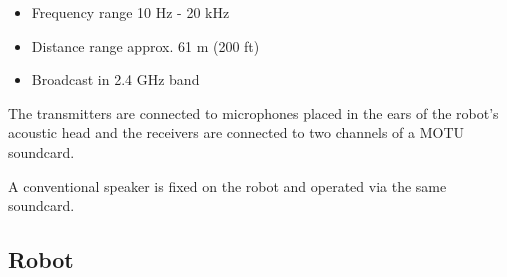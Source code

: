   \begin{itemize}
      \item Frequency range 10 Hz - 20 kHz
      \item Distance range approx. 61 m (200 ft)
      \item Broadcast in 2.4 GHz band
  \end{itemize}

  The transmitters are connected to microphones placed in the ears of the robot's acoustic head and the receivers are connected to two channels of a MOTU soundcard.


  A conventional speaker is fixed on the robot and operated via the same soundcard. 
\subsection{Robot}

